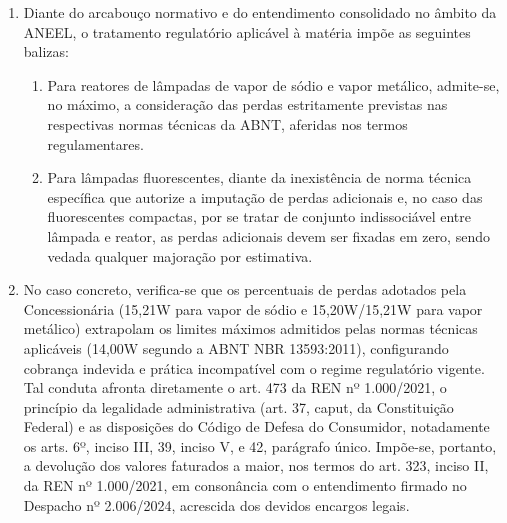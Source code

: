 \begin{enumerate}[resume]
{(ii.d) determinar à Enel Distribuição Ceará enviar aos representantes do Município o detalhamento dos cálculos dos valores devolvidos, conforme art. 133 da Resolução Normativa nº 414, de 2010, discriminando os valores faturados incorretamente para cada tipo de lâmpada, atualização e juros incidentes;  

(iii) determinar que esta decisão seja cumprida no prazo de 15 (quinze) dias após o seu trânsito em julgado; e  

(iv) determinar que a distribuidora envie à ANEEL, num prazo máximo de 15 (quinze) dias após o prazo previsto no item (viii) desta decisão, comprovação do seu cumprimento. (grifou-se)}

\item
Diante do arcabouço normativo e do entendimento consolidado no âmbito da ANEEL, o tratamento regulatório aplicável à matéria impõe as seguintes balizas: 

\begin{enumerate}
    \ifperdaVapor
    \item %
    Para reatores de lâmpadas de vapor de sódio e vapor metálico, admite-se, no máximo, a consideração das perdas estritamente previstas nas respectivas normas técnicas da ABNT, aferidas nos termos regulamentares.
    \fi
    \ifperdaFluorescente
    \item %
    Para lâmpadas fluorescentes, diante da inexistência de norma técnica específica que autorize a imputação de perdas adicionais e, no caso das fluorescentes compactas, por se tratar de conjunto indissociável entre lâmpada e reator, as perdas adicionais devem ser fixadas em zero, sendo vedada qualquer majoração por estimativa.
    \fi
\end{enumerate}

\ifperdaVapor
\item %
No caso concreto, verifica-se que os percentuais de perdas adotados pela Concessionária (15,21W para vapor de sódio e 15,20W/15,21W para vapor metálico) extrapolam os limites máximos admitidos pelas normas técnicas aplicáveis (14,00W segundo a ABNT NBR 13593:2011), configurando cobrança indevida e prática incompatível com o regime regulatório vigente. Tal conduta afronta diretamente o art. 473 da REN nº 1.000/2021, o princípio da legalidade administrativa (art. 37, caput, da Constituição Federal) e as disposições do Código de Defesa do Consumidor, notadamente os arts. 6º, inciso III, 39, inciso V, e 42, parágrafo único. Impõe-se, portanto, a devolução dos valores faturados a maior, nos termos do art. 323, inciso II, da REN nº 1.000/2021, em consonância com o entendimento firmado no Despacho nº 2.006/2024, acrescida dos devidos encargos legais. 


\end{enumerate}
